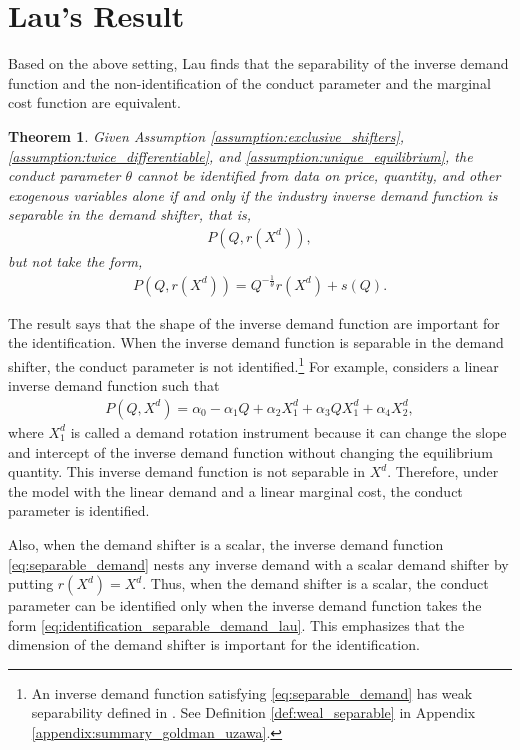 \documentclass[11pt, a4paper]{article}
\newtheorem{theorem}{Theorem}
\theoremstyle{remark}
\begin{document}
\section{Lau's Result}\label{sec:lau_result}
Based on the above setting, Lau finds that the separability of the inverse demand function and the non-identification of the conduct parameter and the marginal cost function are equivalent.
\begin{theorem}\label{theorem_lau}
    Given Assumption \ref{assumption:exclusive_shifters}, \ref{assumption:twice_differentiable}, and \ref{assumption:unique_equilibrium},
    the conduct parameter $\theta$ cannot be identified from data on price, quantity, and other exogenous variables alone if and only if the industry inverse demand function is separable in the demand shifter, that is,
    \begin{align}
        P(Q, r(X^{d})), \label{eq:separable_demand}
    \end{align}
    but not take the form, 
    \begin{align}
        P(Q, r(X^{d})) = Q^{-\frac{1}{\theta}}r(X^{d}) + s(Q). \label{eq:identification_separable_demand_lau}
    \end{align}
\end{theorem}
The result says that the shape of the inverse demand function are important for the identification.
When the inverse demand function is separable in the demand shifter, the conduct parameter is not identified.\footnote{An inverse demand function satisfying \eqref{eq:separable_demand} has weak separability defined in \citet{goldmanNote1964}. See Definition \ref{def:weal_separable} in Appendix \ref{appendix:summary_goldman_uzawa}.}
For example, \citet{bresnahanOligopoly1982} considers a linear inverse demand function such that
\begin{align}
    P(Q, X^{d}) = \alpha_0 - \alpha_1Q + \alpha_2X^{d}_1 + \alpha_3QX^{d}_1 + \alpha_4X^{d}_2, \label{eq:demand_bresnahan}
\end{align}
where $X^{d}_1$ is called a demand rotation instrument because it can change the slope and intercept of the inverse demand function without changing the equilibrium quantity.
This inverse demand function is not separable in $X^{d}$.
Therefore, under the model with the linear demand and a linear marginal cost, the conduct parameter is identified.

Also, when the demand shifter is a scalar, the inverse demand function \eqref{eq:separable_demand} nests any inverse demand with a scalar demand shifter by putting $r(X^{d})= X^{d}$.
Thus, when the demand shifter is a scalar, the conduct parameter can be identified only when the inverse demand function takes the form \eqref{eq:identification_separable_demand_lau}.
This emphasizes that the dimension of the demand shifter is important for the identification.
\end{document}
